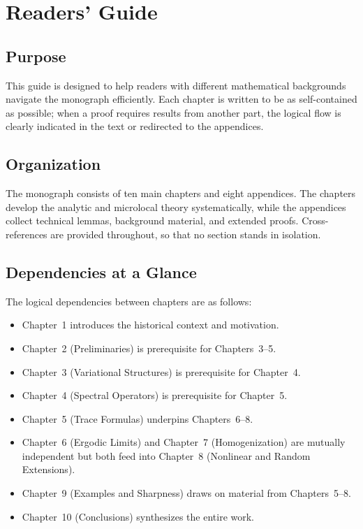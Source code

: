 
\chapter*{Readers' Guide}
\label{chap:readers-guide}

\section*{Purpose}

This guide is designed to help readers with different mathematical backgrounds 
navigate the monograph efficiently. Each chapter is written to be as 
self-contained as possible; when a proof requires results from another part, 
the logical flow is clearly indicated in the text or redirected to the appendices.

\section*{Organization}

The monograph consists of ten main chapters and eight appendices. 
The chapters develop the analytic and microlocal theory systematically, 
while the appendices collect technical lemmas, background material, 
and extended proofs. Cross-references are provided throughout, so that 
no section stands in isolation.

\section*{Dependencies at a Glance}

The logical dependencies between chapters are as follows:

\begin{itemize}
    \item Chapter~1 introduces the historical context and motivation.
    \item Chapter~2 (Preliminaries) is prerequisite for Chapters~3–5.
    \item Chapter~3 (Variational Structures) is prerequisite for Chapter~4.
    \item Chapter~4 (Spectral Operators) is prerequisite for Chapter~5.
    \item Chapter~5 (Trace Formulas) underpins Chapters~6–8.
    \item Chapter~6 (Ergodic Limits) and Chapter~7 (Homogenization) are mutually independent 
          but both feed into Chapter~8 (Nonlinear and Random Extensions).
    \item Chapter~9 (Examples and Sharpness) draws on material from Chapters~5–8.
    \item Chapter~10 (Conclusions) synthesizes the entire work.
\end{itemize}

